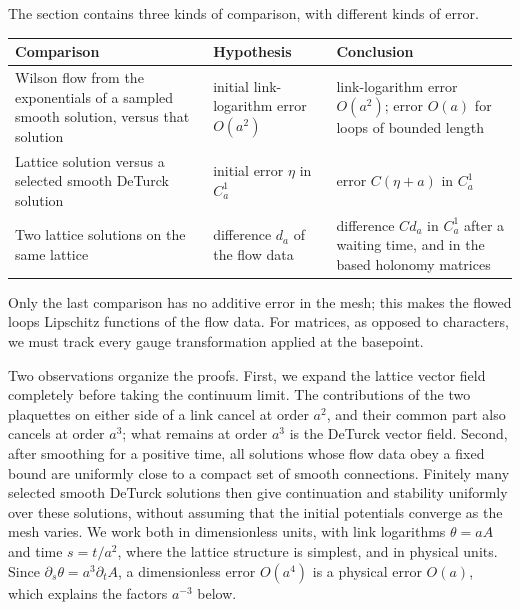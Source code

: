 The section contains three kinds of comparison, with different kinds of error.
\begin{center}
\begin{tabular}{p{}p{}p{}}
\toprule
Comparison & Hypothesis & Conclusion\\
\midrule
Wilson flow from the exponentials of a sampled smooth solution, versus that solution & initial link-logarithm error $O(a^2)$ & link-logarithm error $O(a^2)$; error $O(a)$ for loops of bounded length\\
Lattice solution versus a selected smooth DeTurck solution & initial error $\eta$ in $C^1_a$ & error $C(\eta+a)$ in $C^1_a$\\
Two lattice solutions on the same lattice & difference $d_a$ of the flow data & difference $Cd_a$ in $C^1_a$ after a waiting time, and in the based holonomy matrices\\
\bottomrule
\end{tabular}
\end{center}
Only the last comparison has no additive error in the mesh; this makes the flowed loops Lipschitz functions of the flow data. For matrices, as opposed to characters, we must track every gauge transformation applied at the basepoint.

Two observations organize the proofs. First, we expand the lattice vector field completely before taking the continuum limit. The contributions of the two plaquettes on either side of a link cancel at order $a^2$, and their common part also cancels at order $a^3$; what remains at order $a^3$ is the DeTurck vector field. Second, after smoothing for a positive time, all solutions whose flow data obey a fixed bound are uniformly close to a compact set of smooth connections. Finitely many selected smooth DeTurck solutions then give continuation and stability uniformly over these solutions, without assuming that the initial potentials converge as the mesh varies. We work both in dimensionless units, with link logarithms $\theta=aA$ and time $s=t/a^2$, where the lattice structure is simplest, and in physical units. Since $\partial_s\theta=a^3\partial_tA$, a dimensionless error $O(a^4)$ is a physical error $O(a)$, which explains the factors $a^{-3}$ below.

